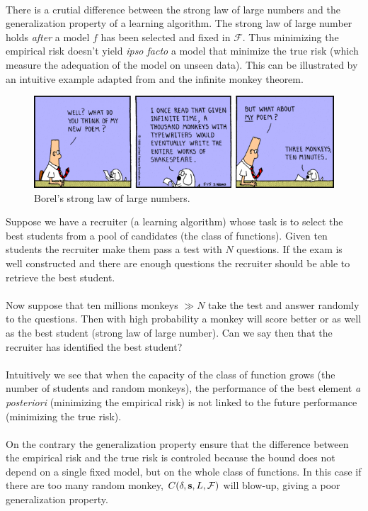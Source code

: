 \paragraph{}
There is a crutial difference between the strong law of large numbers and the
generalization property of a learning algorithm. The strong law of large number
holds \emph{after} a model $f$ has been selected and fixed in $\mathcal{F}$.
Thus minimizing the empirical risk doesn't yield \emph{ipso facto} a model that
minimize the true risk (which measure the adequation of the model on unseen
data). This can be illustrated by an intuitive example adapted from
\citet[page 64]{cornuejols2011apprentissage} and the infinite monkey theorem.
\begin{figure}
    \centering\includegraphics[width=\textwidth]{./gfx/infinite_monkey.jpg}
    \caption{Borel's strong law of large numbers.}
\end{figure}
\begin{example}
    Suppose we have a recruiter (a learning algorithm) whose task is to select 
    the best students from a pool of candidates (the class of functions).
    Given ten students the recruiter make them pass a test with $N$ questions.
    If the exam is well constructed and there are enough questions the
    recruiter should be able to retrieve the best student.
    \paragraph{}
    Now suppose that ten millions monkeys $\gg N$ take the test and answer
    randomly to the questions. Then with high probability a monkey will score
    better or as well as the best student (strong law of large number). Can we
    say then that the recruiter has identified the best
    student?
    \paragraph{}
    Intuitively we see that when the capacity of the class of function grows
    (the number of students and random monkeys), the performance of the best
    element \emph{a posteriori} (minimizing the empirical risk) is not linked
    to the future performance (minimizing the true risk).
    \paragraph{}
    On the contrary the generalization property ensure that the difference
    between the empirical risk and the true risk is controled because the bound
    does not depend on a single fixed model, but on the whole class of
    functions. In this case if there are too many random monkey, $C(\delta,
    \boldsymbol{\mathbf{s}}, L, \mathcal{F})$ will blow-up, giving a poor generalization
    property.
\end{example}
